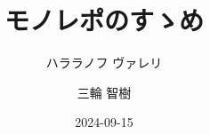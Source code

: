 \documentclass[compress]{beamer}
\title{モノレポのすゝめ}
\author{ハララノフ ヴァレリ \and 三輪 智樹}
\institute{個人\\情報科学若手の会}
\date{2024-09-15} %
\begin{document}
\frame{\titlepage}








\end{document}
